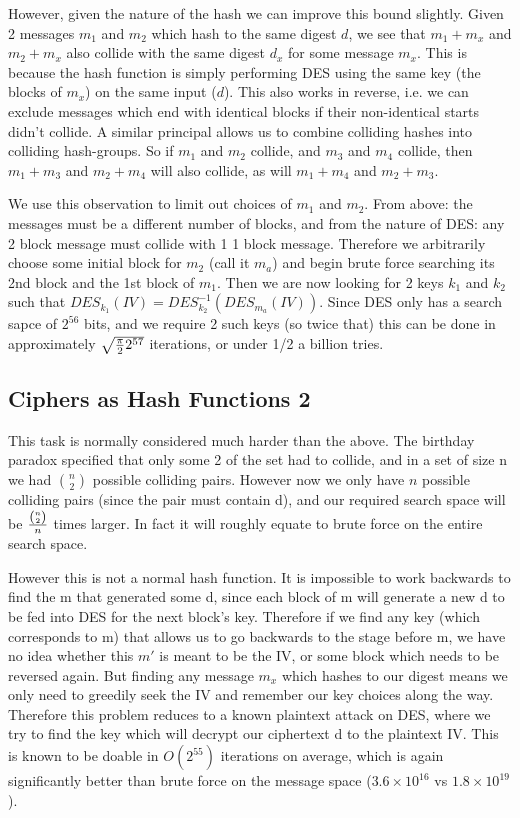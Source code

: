 \documentclass{article}
\begin{document}
However, given the nature of the hash we can improve this bound slightly.
Given 2 messages $m_1$ and $m_2$ which hash to the same digest $d$, we see that $m_1 + m_x$ and $m_2 + m_x$ also collide with the same digest $d_x$ for some message $m_x$.
This is because the hash function is simply performing DES using the same key (the blocks of $m_x$) on the same input ($d$).
This also works in reverse, i.e. we can exclude messages which end with identical blocks if their non-identical starts didn't collide.
A similar principal allows us to combine colliding hashes into colliding hash-groups.
So if $m_1$ and $m_2$ collide, and $m_3$ and $m_4$ collide, then $m_1 + m_3$ and $m_2 + m_4$ will also collide, as will $m_1 + m_4$ and $m_2 + m_3$.

We use this observation to limit out choices of $m_1$ and $m_2$.
From above: the messages must be a different number of blocks, and from the nature of DES: any 2 block message must collide with 1 1 block message.
Therefore we arbitrarily choose some initial block for $m_2$ (call it $m_a$) and begin brute force searching its 2nd block and the 1st block of $m_1$.
Then we are now looking for 2 keys $k_1$ and $k_2$ such that $DES_{k_1}(IV) = DES^{-1}_{k_2}(DES_{m_a}(IV))$.
Since DES only has a search sapce of $2^{56}$ bits, and we require 2 such keys (so twice that) this can be done in approximately $\sqrt{{\pi \over 2}2^{57}}$ iterations, or under 1/2 a billion tries.

\subsection{Ciphers as Hash Functions 2}

This task is normally considered much harder than the above.
The birthday paradox specified that only some 2 of the set had to collide, and in a set of size n we had $n \choose 2$ possible colliding pairs.
However now we only have $n$ possible colliding pairs (since the pair must contain d), and our required search space will be ${n \choose 2} \over {n}$ times larger.
In fact it will roughly equate to brute force on the entire search space.

However this is not a normal hash function.
It is impossible to work backwards to find the m that generated some d, since each block of m will generate a new d to be fed into DES for the next block's key.
Therefore if we find any key (which corresponds to m) that allows us to go backwards to the stage before m, we have no idea whether this $m'$ is meant to be the IV, or some block which needs to be reversed again.
But finding any message $m_x$ which hashes to our digest means we only need to greedily seek the IV and remember our key choices along the way.
Therefore this problem reduces to a known plaintext attack on DES, where we try to find the key which will decrypt our ciphertext d to the plaintext IV.
This is known to be doable in $O(2^55)$ iterations on average, which is again significantly better than brute force on the message space ($3.6 \times 10^{16}$ vs $1.8 \times 10^{19}$).
 
\end{document}
